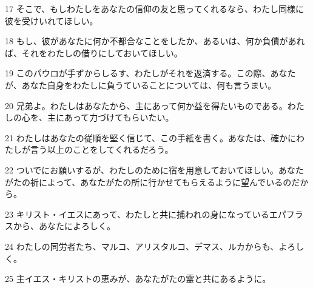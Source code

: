 \par 17 そこで、もしわたしをあなたの信仰の友と思ってくれるなら、わたし同様に彼を受けいれてほしい。
\par 18 もし、彼があなたに何か不都合なことをしたか、あるいは、何か負債があれば、それをわたしの借りにしておいてほしい。
\par 19 このパウロが手ずからしるす、わたしがそれを返済する。この際、あなたが、あなた自身をわたしに負うていることについては、何も言うまい。
\par 20 兄弟よ。わたしはあなたから、主にあって何か益を得たいものである。わたしの心を、主にあって力づけてもらいたい。
\par 21 わたしはあなたの従順を堅く信じて、この手紙を書く。あなたは、確かにわたしが言う以上のことをしてくれるだろう。
\par 22 ついでにお願いするが、わたしのために宿を用意しておいてほしい。あなたがたの祈によって、あなたがたの所に行かせてもらえるように望んでいるのだから。
\par 23 キリスト・イエスにあって、わたしと共に捕われの身になっているエパフラスから、あなたによろしく。
\par 24 わたしの同労者たち、マルコ、アリスタルコ、デマス、ルカからも、よろしく。
\par 25 主イエス・キリストの恵みが、あなたがたの霊と共にあるように。


